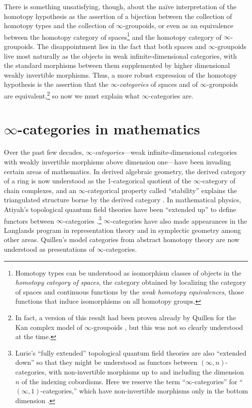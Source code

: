 \documentclass[11pt]{ctexart}
\theoremstyle{definition}
\theoremstyle{remark}
\numberwithin{equation}{section}
\newcommand{\1}{\mathbbe{1}}
\newcommand{\2}{\mathbbe{2}}
\newcommand{\3}{\mathbbe{3}}
\begin{document}
There is something unsatisfying, though, about the na\"{i}ve interpretation of the homotopy hypothesis as the assertion of a bijection between the collection of homotopy types and the collection of $\infty$-groupoids, or even as an equivalence between the homotopy category of spaces\footnote{Homotopy types can be understood as isomorphism classes of objects in the \emph{homotopy category of spaces}, the category obtained by localizing the category of spaces and continuous functions by the \emph{weak homotopy equivalences}, those functions that induce isomorphisms on all homotopy groups.} and the homotopy category of $\infty$-group\-oids. The disappointment lies in the fact that both spaces and $\infty$-groupoids live most naturally as the objects in weak infinite-dimensional categories, with the standard morphisms between them supplemented by higher dimensional weakly invertible morphisms. Thus, a more robust expression of the homotopy hypothesis is the assertion that the $\infty$-\emph{categories} of spaces and of $\infty$-groupoids are equivalent,\footnote{In fact, a version of this result had been proven already by Quillen for the Kan complex  model of $\infty$-groupoids \cite{Quillen}, but this was not so clearly understood at the time.}  so now we must explain what $\infty$-categories are. 


\section{\texorpdfstring{$\infty$}{Infinity}-categories in mathematics}

Over the past few decades, \emph{$\infty$-categories}---weak infinite-dimensional categories with weakly invertible morphisms above dimension one---have been invading certain areas of mathematics. In derived algebraic geometry, the derived category of a ring is now understood as the 1-categorical quotient of the $\infty$-category of chain complexes, and an $\infty$-categorical property called ``stability'' explains the triangulated structure borne by the derived category \cite[\S 1.1]{lurie-algebra}. 
 In mathematical physics, Atiyah's topological quantum field theories have been ``extended up'' to define functors between $\infty$-categories \cite{Freed}.\footnote{Lurie's ``fully extended'' topological quantum field theories are also ``extended down'' so that they might be understood as functors between $(\infty,n)$-categories, with non-invertible morphisms up to and including the dimension $n$ of the indexing cobordisms. Here we reserve the term ``$\infty$-categories'' for ``$(\infty,1)$-categories,'' which have non-invertible morphisms only in the bottom dimension \cite{lurie-tqft}.}  
 $\infty$-categories have also made appearances in the Langlands program in representation theory \cite{FS} 
 and in symplectic geometry \cite{NT} 
  among other areas. Quillen's model categories \cite{Quillen} from abstract homotopy theory are now understood as presentations of $\infty$-categories.    
\end{document}
